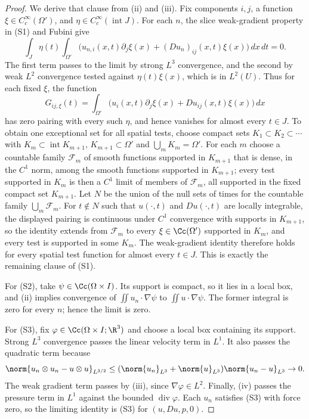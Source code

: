 \documentclass[11pt,reqno]{amsart}
\begin{document}
\begin{proof}
We derive that clause from (ii) and (iii). Fix components $i,j$, a function
$\xi\in C_c^\infty(\Omega')$, and $\eta\in C_c^\infty(\operatorname{int}J)$.
For each $n$, the slice weak-gradient property in (S1) and Fubini give
\[
 \int_J\eta(t)\int_{\Omega'}
       \bigl(u_{n,i}(x,t)\partial_j\xi(x)
              +(Du_n)_{ij}(x,t)\xi(x)\bigr)\,dx\,dt=0.
\]
The first term passes to the limit by strong $L^3$ convergence, and the
second by weak $L^2$ convergence tested against $\eta(t)\xi(x)$, which is in
$L^2(U)$. Thus for each fixed $\xi$, the function
\[
 G_{ij,\xi}(t)=\int_{\Omega'}
       \bigl(u_i(x,t)\partial_j\xi(x)+Du_{ij}(x,t)\xi(x)\bigr)\,dx
\]
has zero pairing with every such $\eta$, and hence vanishes for almost every
$t\in J$. To obtain one exceptional set for all spatial tests, choose
compact sets $K_1\subset K_2\subset\cdots$ with $K_m\subset\operatorname{int}K_{m+1}$,
$K_{m+1}\subset\Omega'$ and $\bigcup_mK_m=\Omega'$. For each $m$ choose a
countable family $\mathcal F_m$ of smooth functions supported in $K_{m+1}$
that is dense, in the $C^1$ norm, among the smooth functions supported in
$K_{m+1}$; every test supported in $K_m$ is then a $C^1$ limit of members of
$\mathcal F_m$, all supported in the fixed compact set $K_{m+1}$. Let $N$ be
the union of the null sets of times for the countable family
$\bigcup_m\mathcal F_m$. For $t\notin N$ such that $u(\cdot,t)$ and
$Du(\cdot,t)$ are locally integrable, the displayed pairing is continuous
under $C^1$ convergence with supports in $K_{m+1}$, so the identity extends
from $\mathcal F_m$ to every $\xi\in\Cc(\Omega')$ supported in $K_m$, and
every test is supported in some $K_m$.
The weak-gradient identity therefore holds for every spatial test function
for almost every $t\in J$. This is exactly the remaining clause of (S1).

For (S2), take $\psi\in\Cc(\Omega\times I)$. Its support is compact, so it
lies in a local box, and (ii) implies convergence of
$\iint u_n\cdot\nabla\psi$ to $\iint u\cdot\nabla\psi$. The former integral
is zero for every $n$; hence the limit is zero.

For (S3), fix $\varphi\in\Cc(\Omega\times I;\R^3)$ and choose a local box
containing its support. Strong $L^3$ convergence passes the linear velocity
term in $L^1$. It also passes the quadratic term because
\[
 \norm{u_n\otimes u_n-u\otimes u}_{L^{3/2}}
 \leq(\norm{u_n}_{L^3}+\norm{u}_{L^3})\norm{u_n-u}_{L^3}\to0.
\]
The weak gradient term passes by (iii), since $\nabla\varphi\in L^2$.
Finally, (iv) passes the pressure term in $L^1$ against the bounded
$\operatorname{div}\varphi$. Each $u_n$ satisfies (S3) with force zero, so
the limiting identity is (S3) for $(u,Du,p,0)$.


\end{proof}
\end{document}
